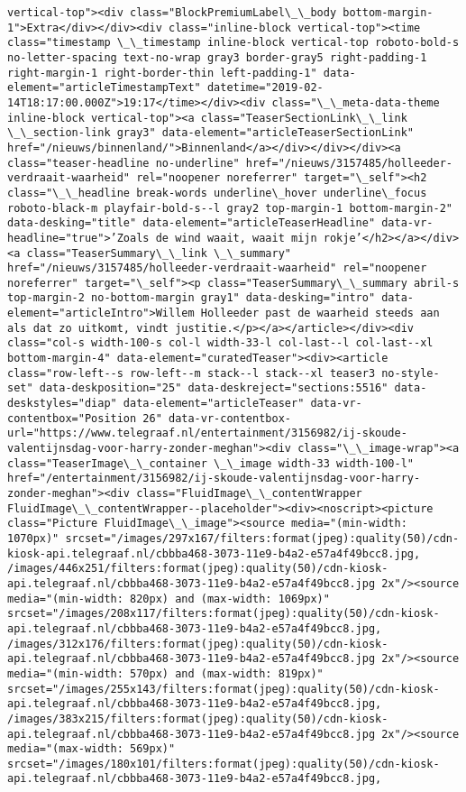 \documentclass[11pt]{article}
\begin{document}
\begin{Verbatim}[commandchars=\\\{\}]
vertical-top"><div class="BlockPremiumLabel\_\_body bottom-margin-1">Extra</div></div><div class="inline-block vertical-top"><time class="timestamp \_\_timestamp inline-block vertical-top roboto-bold-s no-letter-spacing text-no-wrap gray3 border-gray5 right-padding-1 right-margin-1 right-border-thin left-padding-1" data-element="articleTimestampText" datetime="2019-02-14T18:17:00.000Z">19:17</time></div><div class="\_\_meta-data-theme inline-block vertical-top"><a class="TeaserSectionLink\_\_link \_\_section-link gray3" data-element="articleTeaserSectionLink" href="/nieuws/binnenland/">Binnenland</a></div></div></div><a class="teaser-headline no-underline" href="/nieuws/3157485/holleeder-verdraait-waarheid" rel="noopener noreferrer" target="\_self"><h2 class="\_\_headline break-words underline\_hover underline\_focus roboto-black-m playfair-bold-s--l gray2 top-margin-1 bottom-margin-2" data-desking="title" data-element="articleTeaserHeadline" data-vr-headline="true">’Zoals de wind waait, waait mijn rokje’</h2></a></div><a class="TeaserSummary\_\_link \_\_summary" href="/nieuws/3157485/holleeder-verdraait-waarheid" rel="noopener noreferrer" target="\_self"><p class="TeaserSummary\_\_summary abril-s top-margin-2 no-bottom-margin gray1" data-desking="intro" data-element="articleIntro">Willem Holleeder past de waarheid steeds aan als dat zo uitkomt, vindt justitie.</p></a></article></div><div class="col-s width-100-s col-l width-33-l col-last--l col-last--xl bottom-margin-4" data-element="curatedTeaser"><div><article class="row-left--s row-left--m stack--l stack--xl teaser3 no-style-set" data-deskposition="25" data-deskreject="sections:5516" data-deskstyles="diap" data-element="articleTeaser" data-vr-contentbox="Position 26" data-vr-contentbox-url="https://www.telegraaf.nl/entertainment/3156982/ij-skoude-valentijnsdag-voor-harry-zonder-meghan"><div class="\_\_image-wrap"><a class="TeaserImage\_\_container \_\_image width-33 width-100-l" href="/entertainment/3156982/ij-skoude-valentijnsdag-voor-harry-zonder-meghan"><div class="FluidImage\_\_contentWrapper FluidImage\_\_contentWrapper--placeholder"><div><noscript><picture class="Picture FluidImage\_\_image"><source media="(min-width: 1070px)" srcset="/images/297x167/filters:format(jpeg):quality(50)/cdn-kiosk-api.telegraaf.nl/cbbba468-3073-11e9-b4a2-e57a4f49bcc8.jpg, /images/446x251/filters:format(jpeg):quality(50)/cdn-kiosk-api.telegraaf.nl/cbbba468-3073-11e9-b4a2-e57a4f49bcc8.jpg 2x"/><source media="(min-width: 820px) and (max-width: 1069px)" srcset="/images/208x117/filters:format(jpeg):quality(50)/cdn-kiosk-api.telegraaf.nl/cbbba468-3073-11e9-b4a2-e57a4f49bcc8.jpg, /images/312x176/filters:format(jpeg):quality(50)/cdn-kiosk-api.telegraaf.nl/cbbba468-3073-11e9-b4a2-e57a4f49bcc8.jpg 2x"/><source media="(min-width: 570px) and (max-width: 819px)" srcset="/images/255x143/filters:format(jpeg):quality(50)/cdn-kiosk-api.telegraaf.nl/cbbba468-3073-11e9-b4a2-e57a4f49bcc8.jpg, /images/383x215/filters:format(jpeg):quality(50)/cdn-kiosk-api.telegraaf.nl/cbbba468-3073-11e9-b4a2-e57a4f49bcc8.jpg 2x"/><source media="(max-width: 569px)" srcset="/images/180x101/filters:format(jpeg):quality(50)/cdn-kiosk-api.telegraaf.nl/cbbba468-3073-11e9-b4a2-e57a4f49bcc8.jpg, 
\end{Verbatim}
\end{document}
